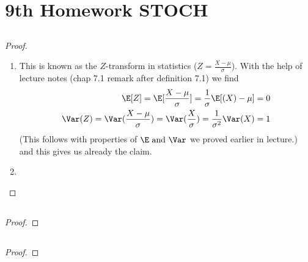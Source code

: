 
\section{9th Homework STOCH}
\subsection{}
\begin{proof}
	\begin{enumerate}
		\item This is known as the $Z$-transform in statistics ($Z = \frac{X-\mu}{\sigma}$). With the help of lecture notes (chap 7.1 remark after definition 7.1) we find
		\begin{align*}
		\E[Z] = \E[\frac{X-\mu}{\sigma}] = \frac{1}{\sigma}\E[(X)-\mu] = 0\\
		\Var(Z) = \Var(\frac{X-\mu}{\sigma}) = \Var(\frac{X}{\sigma}) = \frac{1}{\sigma^2}\Var(X) = 1
		\end{align*}
		(This follows with properties of $\E \and \Var$ we proved earlier in lecture.)
		and this gives us already the claim.
		\item 
	\end{enumerate}
\end{proof}

\subsection{}
\begin{proof}
	
\end{proof}
\subsection{}
\begin{proof}
	
\end{proof}

